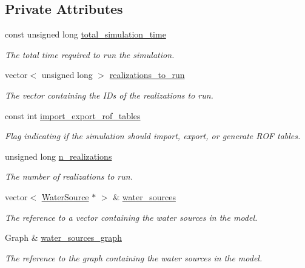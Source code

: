 \subsection*{Private Attributes}
\begin{DoxyCompactItemize}
\item 
const unsigned long \mbox{\hyperlink{classSimulation_a6c7ad426929c59e061750b6d923aa859}{total\+\_\+simulation\+\_\+time}}
\begin{DoxyCompactList}\small\item\em The total time required to run the simulation. \end{DoxyCompactList}\item 
vector$<$ unsigned long $>$ \mbox{\hyperlink{classSimulation_a6753fbf18cf9793b0ea3f4c070836af3}{realizations\+\_\+to\+\_\+run}}
\begin{DoxyCompactList}\small\item\em The vector containing the I\+Ds of the realizations to run. \end{DoxyCompactList}\item 
const int \mbox{\hyperlink{classSimulation_a0989380cd166a60c2ba8bb2a1a9c138c}{import\+\_\+export\+\_\+rof\+\_\+tables}}
\begin{DoxyCompactList}\small\item\em Flag indicating if the simulation should import, export, or generate R\+OF tables. \end{DoxyCompactList}\item 
unsigned long \mbox{\hyperlink{classSimulation_ab365c523e28a3af3be06e251b478e2b0}{n\+\_\+realizations}}
\begin{DoxyCompactList}\small\item\em The number of realizations to run. \end{DoxyCompactList}\item 
vector$<$ \mbox{\hyperlink{classWaterSource}{Water\+Source}} $\ast$ $>$ \& \mbox{\hyperlink{classSimulation_a7cf5edb885d26074e51e183408a3adab}{water\+\_\+sources}}
\begin{DoxyCompactList}\small\item\em The reference to a vector containing the water sources in the model. \end{DoxyCompactList}\item 
Graph \& \mbox{\hyperlink{classSimulation_a04d4514b77ae98ec66cb8c2d633b2a52}{water\+\_\+sources\+\_\+graph}}
\begin{DoxyCompactList}\small\item\em The reference to the graph containing the water sources in the model. \end{DoxyCompactList}\item 

\end{DoxyCompactItemize}
